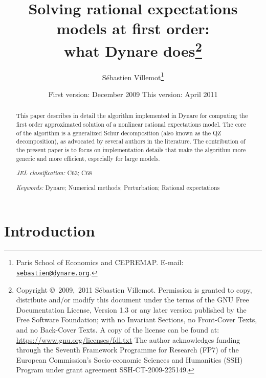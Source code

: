 \documentclass[11pt,a4paper]{article}
\begin{document}
\author{S\'ebastien Villemot\thanks{Paris School of Economics and
    CEPREMAP. E-mail:
    \href{mailto:sebastien@dynare.org}{\texttt{sebastien@dynare.org}}.}}

\title{Solving rational expectations models at first order: \\
  what Dynare does\thanks{Copyright \copyright~2009,~2011 S\'ebastien
    Villemot. Permission is granted to copy, distribute and/or modify
    this document under the terms of the GNU Free Documentation
    License, Version 1.3 or any later version published by the Free
    Software Foundation; with no Invariant Sections, no Front-Cover
    Texts, and no Back-Cover Texts. A copy of the license can be found
    at: \url{https://www.gnu.org/licenses/fdl.txt}
    \newline
    The author acknowledges funding through the Seventh Framework Programme
    for Research (FP7) of the European Commission's Socio-economic Sciences and
    Humanities (SSH) Program under grant agreement SSH-CT-2009-225149.}
}

\date{First version: December 2009 \hspace{1cm} This version: April 2011}
\maketitle

\begin{abstract}
  This paper describes in detail the algorithm implemented in Dynare for
  computing the first order approximated solution of a nonlinear rational
  expectations model. The core of the algorithm is a generalized Schur
  decomposition (also known as the QZ decomposition), as advocated by several
  authors in the literature. The contribution of the present paper is to focus
  on implementation details that make the algorithm more generic and more
  efficient, especially for large models.

  \medskip
  \noindent
  \textit{JEL classification:} C63; C68

  \medskip
  \noindent
  \textit{Keywords:} Dynare; Numerical methods; Perturbation; Rational
  expectations

\end{abstract}

\section{Introduction}
\end{document}

